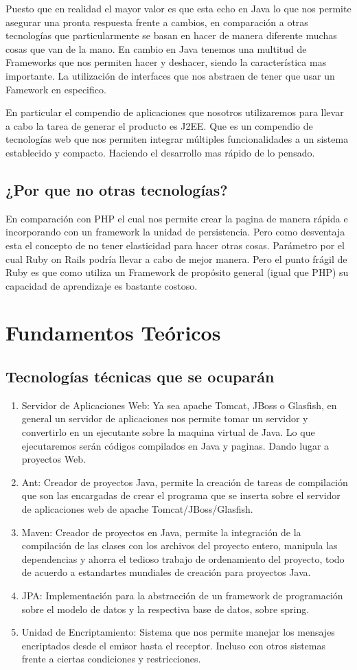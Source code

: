 \documentclass[a4paper,12pt,openany,oneside]{book}
\begin{document}
Puesto que en realidad el mayor valor es que esta echo en Java lo que nos permite asegurar una pronta respuesta frente a cambios, en comparación a otras tecnologías que particularmente se basan en hacer de manera diferente muchas cosas que van de la mano. En cambio en Java tenemos una multitud de Frameworks que nos permiten hacer y deshacer, siendo la característica mas importante. La utilización de interfaces que nos abstraen de tener que usar un Famework en especifico.

En particular el compendio de aplicaciones que nosotros utilizaremos para llevar a cabo la tarea de generar el producto es J2EE. Que es un compendio de tecnologías web que nos permiten integrar múltiples funcionalidades a un sistema establecido y compacto. Haciendo el desarrollo mas rápido de lo pensado.
\subsection{¿Por que no otras tecnologías?}
En comparación con PHP el cual nos permite crear la pagina de manera rápida e incorporando con un framework la unidad de persistencia. Pero como desventaja esta el concepto de no tener elasticidad para hacer otras cosas. Parámetro por el cual Ruby on Rails podría llevar a cabo de mejor manera. Pero el punto frágil de Ruby es que como utiliza un Framework de propósito general (igual que PHP) su capacidad de aprendizaje es bastante costoso. 
\section{Fundamentos Teóricos}
\subsection{Tecnologías técnicas que se ocuparán}
\begin{enumerate}
\item Servidor de Aplicaciones Web: Ya sea apache Tomcat, JBoss o Glasfish, en general un servidor de aplicaciones nos permite tomar un servidor y convertirlo en un ejecutante sobre la maquina virtual de Java. Lo que ejecutaremos serán códigos compilados en Java y paginas. Dando lugar a proyectos Web.
\item Ant: Creador de proyectos Java, permite la creación de tareas de compilación que son las encargadas de crear el programa que se inserta sobre el servidor de aplicaciones web de apache Tomcat/JBoss/Glasfish.
\item Maven: Creador de proyectos en Java, permite la integración de la compilación de las clases con los archivos del proyecto entero, manipula las dependencias y ahorra el tedioso trabajo de ordenamiento del proyecto, todo de acuerdo a estandartes mundiales de creación para proyectos Java.
\item JPA: Implementación para la abstracción de un framework de programación sobre el modelo de datos y la respectiva base de datos, sobre spring.
\item Unidad de Encriptamiento: Sistema que nos permite manejar los mensajes encriptados desde el emisor hasta el receptor. Incluso con otros sistemas frente a ciertas condiciones y restricciones.
\end{enumerate}
\end{document}

